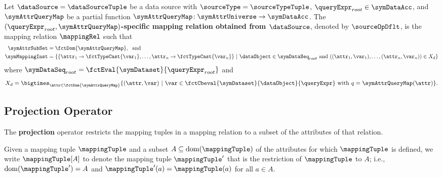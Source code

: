 \begin{definition}
	\label{def:source_operator}
	\normalfont
	Let $\dataSource = \dataSourceTuple$ be a data source with
	$\sourceType=\sourceTypeTuple$,
	$\queryExpr_{root} \in \symDataAcc$, and
	$\symAttrQueryMap$ be a partial function
	$\symAttrQueryMap \!: \symAttrUniverse  \rightarrow \symDataAcc$.
	The \textbf{$(\queryExpr_{root},\symAttrQueryMap)$-specific mapping relation obtained from $\dataSource$}, denoted by $\sourceOpDflt$, is the mapping relation $\mappingRel$ such that
	\begin{align*}
		\symAttrSubSet  & = \fctDom{\symAttrQueryMap},
		\; \text{ and}
		\\
		\symMappingInst & = \left\{ \{\attr_1 \rightarrow \fctTypeCast{\var_1}, \dots, \attr_n \rightarrow \fctTypeCast{\var_n} \} \ | \
		\dataObject \in \symDataSeq_{root} \text{ and } ((\attr_1 , \var_1), \dots, (\attr_n , \var_n)) \in X_d\right\}
	\end{align*}
	where $\symDataSeq_{root} = \fctEval{\symDataset}{\queryExpr_{root}}$ and
	\begin{equation}
		X_d = \bigtimes_{\attr \in \fctDom{\symAttrQueryMap}}
		\{(\attr, \var) \ | \
		\var \in \fctCbeval{\symDataset}{\dataObject}{\queryExpr} \text{ with }  q = \symAttrQueryMap(\attr)\}
		.
	\end{equation}
\end{definition}







\subsection{Projection Operator}%
\label{sub:projection_operator}

The \textbf{projection} operator restricts the mapping tuples in a mapping
relation to a subset of the attributes of that relation.


\begin{definition}
	\label{def:tuple_restrict}
	Given a mapping tuple $\mappingTuple$ and a subset $A \subseteq
		\mathrm{dom}(\mappingTuple)$ of the attributes for which $\mappingTuple$ is
	defined, we write $\mappingTuple[A]$ to denote the mapping tuple
	$\mappingTuple'$ that is the restriction of $\mappingTuple$ to $A$;
	i.e., $\mathrm{dom}(\mappingTuple') = A$ and $\mappingTuple'(a) =
		\mappingTuple(a)$ for all $a \in A$.
\end{definition}

